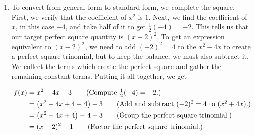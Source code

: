 \medskip


{
\begin{enumerate}

\item   To convert from general form to standard form, we complete the square. First, we verify that the coefficient of $x^2$ is $1$.  Next, we find the coefficient of $x$, in this case $-4$, and take half of it to get $\frac{1}{2}(-4) = -2$.  This tells us that our target perfect square quantity is $(x-2)^2$.  To get an expression equivalent to $(x-2)^2$, we need to add $(-2)^2 = 4$ to the $x^2-4x$ to create a perfect square trinomial, but to keep the balance, we must also subtract it.  We collect the terms which create the perfect square and gather the remaining constant terms. Putting it all together, we get 


\begin{align*}
f(x) & =  x^2-4x+3  \tag*{(Compute $\frac{1}{2} (-4) = -2$.)} \\
     & =  \left(x^2 - 4x + \underline{4}  - \underline{4}\right) + 3  \tag*{(Add and subtract $(-2)^2 = 4$ to $(x^2+4x)$.)}\\
          & =  \left(x^2 - 4x + 4\right)  - 4 + 3  \tag*{(Group the perfect square trinomial.)}\\
     & =  (x-2)^2 - 1  \tag*{(Factor the perfect square trinomial.)}
\end{align*}

\smallskip



\end{enumerate}}
